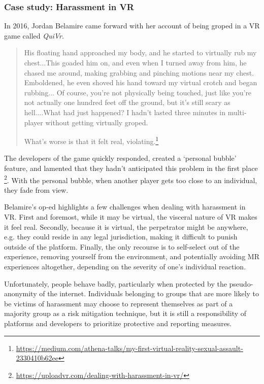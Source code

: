 
\subsubsection{Case study: Harassment in VR}
In 2016, Jordan Belamire came forward with her account of being groped in a VR game called \emph{QuiVr}.

\begin{quote}
His floating hand approached my body, and he started to virtually rub my chest...This goaded him on, and even when I turned away from him, he chased me around, making grabbing and pinching motions near my chest. Emboldened, he even shoved his hand toward my virtual crotch and began rubbing... Of course, you’re not physically being touched, just like you’re not actually one hundred feet off the ground, but it’s still scary as hell....What had just happened? I hadn’t lasted three minutes in multi-player without getting virtually groped. 

What’s worse is that it felt real, violating.\footnote{\url{https://medium.com/athena-talks/my-first-virtual-reality-sexual-assault-2330410b62ee}}
\end{quote}

The developers of the game quickly responded, created a `personal bubble' feature, and lamented that they hadn't anticipated this problem in the first place \footnote{\url{https://uploadvr.com/dealing-with-harassment-in-vr/}}. With the personal bubble, when another player gets too close to an individual, they fade from view.

Belamire's op-ed highlights a few challenges when dealing with harassment in VR. First and foremost, while it may be virtual, the visceral nature of VR makes it feel real. Secondly, because it is virtual, the perpetrator might be anywhere, e.g. they could reside in any legal jurisdiction, making it difficult to punish outside of the platform. Finally, the only recourse is to self-select out of the experience, removing yourself from the environment, and potentially avoiding MR experiences altogether, depending on the severity of one's individual reaction.

Unfortunately, people behave badly, particularly when protected by the pseudo-anonymity of the internet. Individuals belonging to groups that are more likely to be victims of harassment may choose to represent themselves as part of a majority group as a risk mitigation technique, but it is still a responsibility of platforms and developers to prioritize protective and reporting measures.


